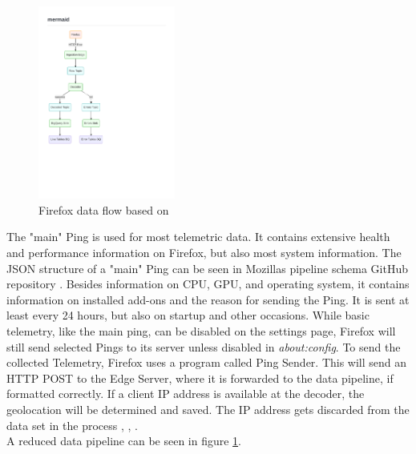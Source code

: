         \begin{figure}
            \centering
            \includegraphics[clip, trim=0.5cm 8cm 8cm 3.5cm, width=0.4\textwidth]{latex/figures/firefox_telemetry_graph}
            \caption[Firefox data flow]{Firefox data flow based on  \cite{mozilla_overview_2020}}
            \label{fig:moz_data_flow}
        \end{figure}
        
        The "main" Ping is used for most telemetric data. It contains extensive health and performance information on Firefox, but also most system information. The JSON structure of a "main" Ping can be seen in Mozillas pipeline schema GitHub repository \cite{mozilla_mozilla-servicesmozilla-pipeline-schemas_2020}. 
        Besides information on CPU, GPU, and operating system, it contains information on installed add-ons and the reason for sending the Ping.
        It is sent at least every 24 hours, but also on startup and other occasions. While basic telemetry, like the main ping, can be disabled on the settings page, Firefox will still send selected Pings to its server unless disabled in \textit{about:config}.
        To send the collected Telemetry, Firefox uses a program called Ping Sender.
        This will send an HTTP POST to the Edge Server, where it is forwarded to the data pipeline, if formatted correctly.
        If a client IP address is available at the decoder, the geolocation will be determined and saved.
        The IP address gets discarded from the data set in the process \cite{mozilla_overview_2020}, \cite{mozilla_http_2020}, \cite{firefox_ping_nodate}.\\
        A reduced data pipeline can be seen in figure \ref{fig:moz_data_flow}.
        
